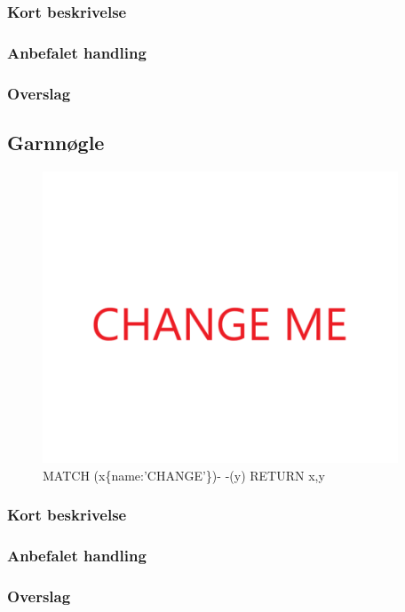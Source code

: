 \documentclass{article}
\begin{document}
\subsubsection{Kort beskrivelse}
\subsubsection{Anbefalet handling}
\subsubsection{Overslag}
\subsection{Garnnøgle}


\begin{figure}[h]
\includegraphics[width=300pt]{CHANGE.PNG}
\caption{MATCH (x\{name:'CHANGE'\})- -(y) RETURN x,y}
\end{figure}
\subsubsection{Kort beskrivelse}
\subsubsection{Anbefalet handling}
\subsubsection{Overslag}
\end{document}
